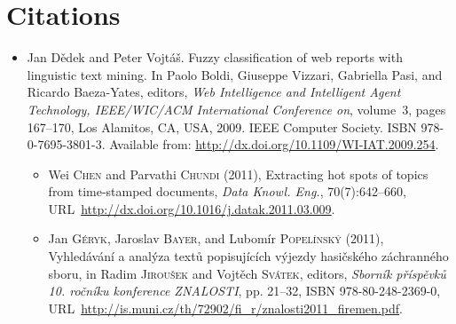 \documentclass[12pt,a4paper,oneside,notitlepage]{article}
\newcommand{\urlprefix}{URL~}
\begin{document}
\section*{Citations}



\begin{itemize}

\item
Jan D{\v{e}}dek and Peter Vojt{\'{a}}{\v{s}}.
\newblock Fuzzy classification of web reports with linguistic text mining.
\newblock In Paolo Boldi, Giuseppe Vizzari, Gabriella Pasi, and Ricardo
  Baeza-Yates, editors, {\em Web Intelligence and Intelligent Agent Technology,
  IEEE/WIC/ACM International Conference on}, volume~3, pages 167--170, Los
  Alamitos, CA, USA, 2009. IEEE Computer Society.
\newblock ISBN 978-0-7695-3801-3.
\newblock Available from: \url{http://dx.doi.org/10.1109/WI-IAT.2009.254}.

\begin{itemize}
\item
Wei \textsc{Chen} and Parvathi \textsc{Chundi} (2011), Extracting hot spots of
  topics from time-stamped documents, \emph{Data Knowl. Eng.}, 70(7):642--660,
  \urlprefix\url{http://dx.doi.org/10.1016/j.datak.2011.03.009}.
	
\item
Jan \textsc{G{\'e}ryk}, Jaroslav \textsc{Bayer}, and Lubom{\'i}r
  \textsc{Popel{\'i}nsk{\'y}} (2011), Vyhled{\'a}v{\'a}n{\'i} a anal{\'y}za
  text{\r{u}} popisuj{\'i}c{\'i}ch v{\'y}jezdy hasi{\v{c}}sk{\'e}ho
  z{\'a}chrann{\'e}ho sboru, in Radim \textsc{Jirou{\v{s}}ek} and Vojt{\v{e}}ch
  \textsc{Sv{\'a}tek}, editors, \emph{Sborn{\'i}k
  p{\v{r}}{\'i}sp{\v{e}}vk{\r{u}} 10. ro{\v{c}}n{\'i}ku konference ZNALOSTI},
  pp. 21--32, ISBN 978-80-248-2369-0,
  \urlprefix\url{http://is.muni.cz/th/72902/fi_r/znalosti2011_firemen.pdf}.	
	
%
\end{itemize}




\end{itemize}
\end{document}
